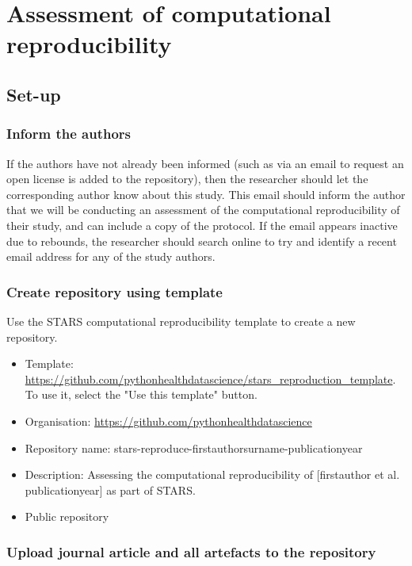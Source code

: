 \section{Assessment of computational reproducibility} \label{sec:reproduce}

\subsection{Set-up}

\subsubsection{Inform the authors}
\timeno

If the authors have not already been informed (such as via an email to request an open license is added to the repository), then the researcher should let the corresponding author know about this study. This email should inform the author that we will be conducting an assessment of the computational reproducibility of their study, and can include a copy of the protocol. If the email appears inactive due to rebounds, the researcher should search online to try and identify a recent email address for any of the study authors.

\subsubsection{Create repository using template}
\timeno

Use the STARS computational reproducibility template to create a new repository.

\begin{itemize}
    \item Template: \url{https://github.com/pythonhealthdatascience/stars_reproduction_template}. To use it, select the "Use this template" button.
    \item Organisation: \url{https://github.com/pythonhealthdatascience}
    \item Repository name: stars-reproduce-firstauthorsurname-publicationyear
    \item Description: Assessing the computational reproducibility of [firstauthor et al. publicationyear] as part of STARS.
    \item Public repository
\end{itemize}

\subsubsection{Upload journal article and all artefacts to the repository}
\timeyes

